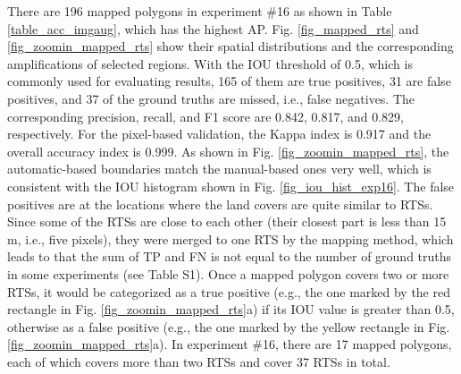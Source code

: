 \documentclass[preprint,12pt,authoryear]{elsarticle}
\begin{document}
There are 196 mapped polygons in experiment \#16 as shown in Table \ref{table_acc_imgaug}, which has the highest AP.  Fig. \ref{fig_mapped_rts} and \ref{fig_zoomin_mapped_rts} show their spatial distributions and the corresponding ampliﬁcations of selected regions. With the IOU threshold of 0.5, which is commonly used for evaluating results, 165 of them are true positives, 31 are false positives, and 37 of the ground truths are missed, i.e., false negatives. The corresponding precision, recall, and F1 score are 0.842, 0.817, and 0.829, respectively. For the pixel-based validation, the Kappa index is 0.917 and the overall accuracy index is 0.999. As shown in Fig. \ref{fig_zoomin_mapped_rts}, the automatic-based boundaries match the manual-based ones very well, which is consistent with the IOU histogram shown in Fig. \ref{fig_iou_hist_exp16}. The false positives are at the locations where the land covers are quite similar to RTSs. Since some of the RTSs are close to each other (their closest part is less than 15 m, i.e., five pixels), they were merged to one RTS by the mapping method, which leads to that the sum of TP and FN is not equal to the number of ground truths in some experiments (see Table S1). Once a mapped polygon covers two or more RTSs, it would be categorized as a true positive (e.g., the one marked by the red rectangle in Fig. \ref{fig_zoomin_mapped_rts}a) if its IOU value is greater than 0.5, otherwise as a false positive (e.g., the one marked by the yellow rectangle in Fig. \ref{fig_zoomin_mapped_rts}a). In experiment \#16, there are 17 mapped polygons, each of which covers more than two RTSs and cover 37 RTSs in total. 

\end{document}

